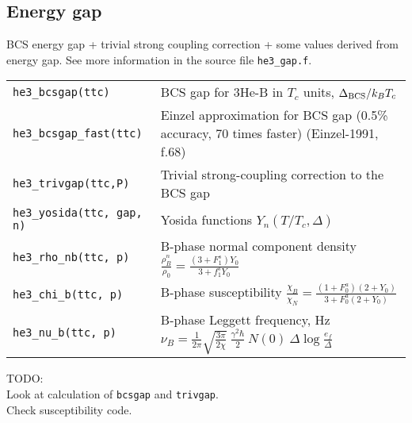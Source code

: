 \documentclass[a4paper]{article}
\begin{document}
\subsection*{Energy gap}

BCS energy gap + trivial strong coupling correction + some values
derived from energy gap. See more information in the
source file {\tt he3\_gap.f}.

\medskip
\noindent\begin{tabular}{lp{12.5cm}}
\tt he3\_bcsgap(ttc)       & BCS gap for 3He-B in $T_c$ units, $\Delta_{\rm BCS}/ k_B T_c$\\
\tt he3\_bcsgap\_fast(ttc) & Einzel approximation for BCS gap (0.5\% accuracy, 70 times faster)\newline
                             {\small(Einzel-1991, f.68)}\\
\tt he3\_trivgap(ttc,P) & Trivial strong-coupling correction to the BCS gap\\
\tt he3\_yosida(ttc, gap, n) & Yosida functions $Y_n(T/T_c,\Delta)$\\

\tt he3\_rho\_nb(ttc, p)     &B-phase normal component density\newline
                             $\displaystyle \frac{\rho_B^n}{\rho_0} =
                               \frac{(3 + F_1^s) Y_0}{3 + f_1^s Y_0}$\\
\tt he3\_chi\_b(ttc, p)      &B-phase susceptibility\newline
                             $\displaystyle \frac{\chi_B}{\chi_N} =
                               \frac{(1+F_0^a)(2 + Y_0)}
                                     {3+F_0^a(2 + Y_0)}$\\
\tt he3\_nu\_b(ttc, p)       &B-phase Leggett frequency, Hz\newline
                             $\displaystyle \nu_B =\frac{1}{2\pi}\sqrt{\frac{3\pi}{2\chi}}
                             \ \frac{\gamma^2\hbar}{2}\ N(0)\ \Delta \log\frac{e_f}{\Delta}  $\\


\end{tabular}
\medskip

\noindent TODO:\\
Look at calculation of {\tt bcsgap} and {\tt trivgap}.\\
Check susceptibility code.
\end{document}
